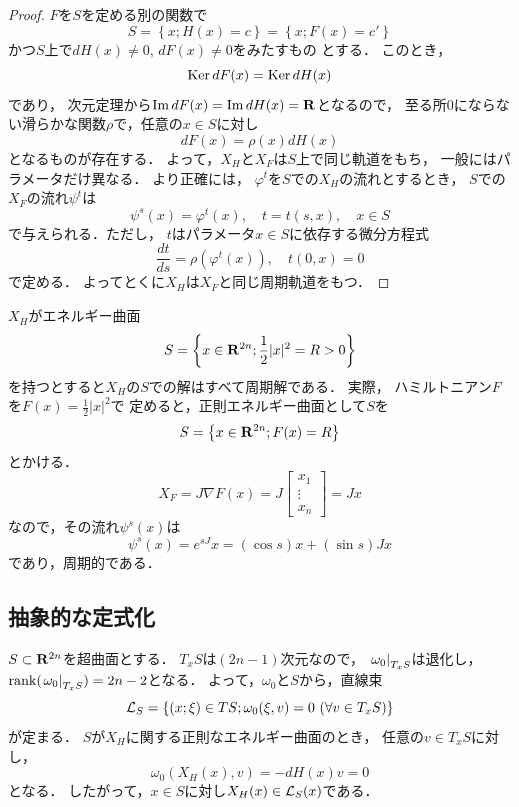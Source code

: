\begin{proof}
    \(F\)を\(S\)を定める別の関数で
    \[
        S=
        \left\{x; H(x)=c\right\}
        =
        \left\{x; F(x)=c'\right\}
    \]
    かつ\(S\)上で\(dH(x)\ne0\), \(dF(x)\ne0\)をみたすもの
    とする．
    このとき，\[
        \Ker{dF(x)}=\Ker{dH(x)}
    \]であり，
    次元定理から\(\Img{dF(x)}=\Img{dH(x)}=\rr\)となるので，
    至る所\(0\)にならない滑らかな関数\(\rho\)で，任意の\(x\in S\)に対し\[
        dF(x)=\rho(x)dH(x)
    \]となるものが存在する．
    よって，\(X_H\)と\(X_F\)は\(S\)上で同じ軌道をもち，
    一般にはパラメータだけ異なる．
    より正確には，
    \(\varphi^t\)を\(S\)での\(X_H\)の流れとするとき，
    \(S\)での\(X_F\)の流れ\(\psi^t\)は\[
        \psi^s(x)=\varphi^{t}(x),\quad
        t=t(s,x),
        \quad
        x\in S
    \]で与えられる．ただし，
    \(t\)はパラメータ\(x\in S\)に依存する微分方程式\[
        \frac{dt}{ds}=\rho\left(\varphi^t(x)\right),\quad
        t(0,x)=0
    \]で定める．
    よってとくに\(X_H\)は\(X_F\)と同じ周期軌道をもつ．
\end{proof}

\begin{EG*}
    \(X_H\)がエネルギー曲面\[
        S=\left\{x\in\rr^{2n}; 
        \frac{1}{2}\lvert x\rvert^2=R>0
        \right\}
    \]を持つとすると\(X_H\)の\(S\)での解はすべて周期解である．
    実際，
    ハミルトニアン\(F\)を\(F(x)= \frac{1}{2}\lvert x\rvert^2\)で
    定めると，正則エネルギー曲面として\(S\)を
    \[
        S=\left\{x\in\rr^{2n}; 
        F(x)=R
        \right\}
    \]とかける．
    \[
        X_F
        =J\nabla F(x)
        =J
        \begin{bmatrix}
            x_1\\
            \vdots\\
            x_n
        \end{bmatrix}
        =Jx
    \]
    なので，その流れ\(\psi^s(x)\)は
    \[
        \psi^s(x)=
        e^{sJ}x
        =(\cos{s})x+(\sin{s})Jx
    \]
    であり，周期的である．
\end{EG*}

\subsection*{抽象的な定式化}
\(S\subset \rr^{2n}\)を超曲面とする．
\(T_xS\)は\((2n-1)\)次元なので，
\(\mres[\omega_{0}]{T_{x}S}\)は退化し，
\(\rank(\mres[\omega_{0}]{T_{x}S})=2n-2\)となる．
よって，\(\omega_0\)と\(S\)から，直線束
\[
    \cL_S
    =
    \left\{
        (x;\xi)\in TS;
        \omega_0(\xi,v)=0\ (\forall v\in T_xS)
    \right\}
\]が定まる．
\(S\)が\(X_H\)に関する正則なエネルギー曲面のとき，
任意の\(v\in T_xS\)に対し，
\[
    \omega_0(X_{H}(x),v)=-dH(x)v=0
\]
となる．
したがって，\(x\in S\)に対し\(X_H(x)\in\cL_S(x)\)である．


